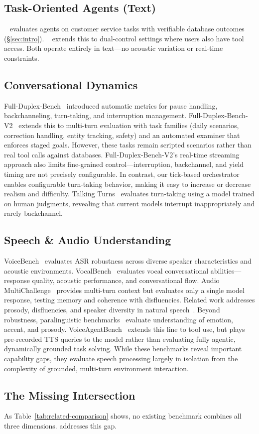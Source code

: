 \subsection{Task-Oriented Agents (Text)}

\taubench{}~\cite{yao_-bench_2024} evaluates agents on customer service tasks with verifiable database outcomes (\S\ref{sec:intro}). \tautwobench{}~\cite{barres_2-bench_2025} extends this to dual-control settings where users also have tool access. Both operate entirely in text---no acoustic variation or real-time constraints.

\subsection{Conversational Dynamics}

Full-Duplex-Bench~\cite{lin_full-duplex-bench_2025} introduced automatic metrics for pause handling, backchanneling, turn-taking, and interruption management. Full-Duplex-Bench-V2~\cite{lin_full-duplex-bench-v2_2025} extends this to multi-turn evaluation with task families (daily scenarios, correction handling, entity tracking, safety) and an automated examiner that enforces staged goals. However, these tasks remain scripted scenarios rather than real tool calls against databases. Full-Duplex-Bench-V2's real-time streaming approach also limits fine-grained control---interruption, backchannel, and yield timing are not precisely configurable. In contrast, our tick-based orchestrator enables configurable turn-taking behavior, making it easy to increase or decrease realism and difficulty. Talking Turns~\cite{arora_talking_2025} evaluates turn-taking using a model trained on human judgments, revealing that current models interrupt inappropriately and rarely backchannel.

\subsection{Speech \& Audio Understanding}

VoiceBench~\cite{chen_voicebench_2024} evaluates ASR robustness across diverse speaker characteristics and acoustic environments. VocalBench~\cite{liu_vocalbench_2026} evaluates vocal conversational abilities—response quality, acoustic performance, and conversational flow. Audio MultiChallenge~\cite{gosai_audio_2025} provides multi-turn context but evaluates only a single model response, testing memory and coherence with disfluencies. Related work addresses prosody, disfluencies, and speaker diversity in natural speech~\cite{zhang_wildspeech-bench_2025, wang_audiobench_2025}. Beyond robustness, paralinguistic benchmarks~\cite{jiang_s2s-arena_2025, yang_paras2s_2025, ao_sd-eval_2025} evaluate understanding of emotion, accent, and prosody. VoiceAgentBench~\cite{jain2026voiceagentbenchvoiceassistantsready} extends this line to tool use, but plays pre-recorded TTS queries to the model rather than evaluating fully agentic, dynamically grounded task solving. While these benchmarks reveal important capability gaps, they evaluate speech processing largely in isolation from the complexity of grounded, multi-turn environment interaction.

\subsection{The Missing Intersection}

As Table~\ref{tab:related-comparison} shows, no existing benchmark combines all three dimensions. \tauvoice{} addresses this gap.
